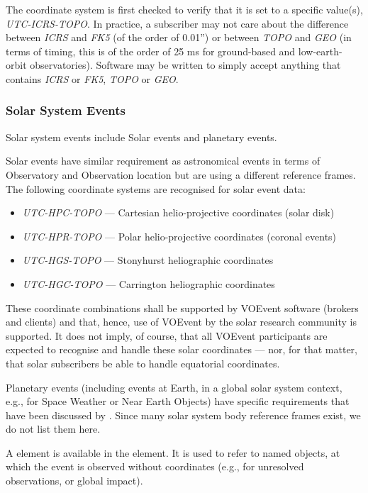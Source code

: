 \documentclass[11pt,a4paper]{ivoa}
\begin{document}
The coordinate system is first checked to verify that it is set to a specific
value(s), \emph{UTC-ICRS-TOPO}. In practice, a subscriber may not care about the
difference between \emph{ICRS} and \emph{FK5} (of the order of 0.01'') or
between \emph{TOPO} and \emph{GEO} (in terms of timing, this is of the order of
25 ms for ground-based and low-earth-orbit observatories). Software may be
written to simply accept anything that contains \emph{ICRS} or \emph{FK5},
\emph{TOPO} or \emph{GEO}.


\subsubsection{Solar System Events}
\label{sec:3.4.4}
Solar system events include Solar events and planetary events.

Solar events have similar requirement as astronomical events in terms of
Observatory and Observation location but are using a different reference frames.
The following coordinate systems are recognised for solar event data:
\begin{itemize}
\item \emph{UTC-HPC-TOPO} --- Cartesian helio-projective coordinates (solar disk)
\item \emph{UTC-HPR-TOPO} --- Polar helio-projective coordinates (coronal events)
\item \emph{UTC-HGS-TOPO} --- Stonyhurst heliographic coordinates
\item \emph{UTC-HGC-TOPO} --- Carrington heliographic coordinates
\end{itemize}

These coordinate combinations shall be supported by VOEvent software (brokers
and clients) and that, hence, use of VOEvent by the solar research community is
supported. It does not imply, of course, that all VOEvent participants are
expected to recognise and handle these solar coordinates --- nor, for that
matter, that solar subscribers be able to handle equatorial coordinates.

Planetary events (including events at Earth, in a global solar system context,
e.g., for Space Weather or Near Earth Objects) have specific requirements that
have been discussed by \citet{2018arXiv181112680C}. Since many solar system body
reference frames exist, we do not list them here.

A  element is available in the
 element. It is used to refer to named objects,
at which the event is observed without coordinates (e.g., for unresolved
observations, or global impact).
\end{document}
